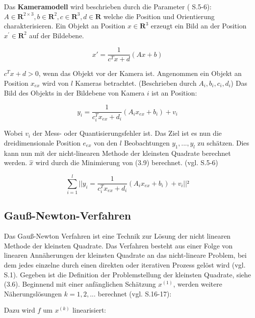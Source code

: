 Das \textbf{Kameramodell} wird beschrieben durch die Parameter (\cite{nonlinear_1} S.5-6): $A \in  \textbf{R}^{2\times 3}, b \in \textbf{R}^2, c \in  \textbf{R}^3, d \in \textbf{R}$ welche die Position und Orientierung charakterisieren. Ein Objekt an Position $x \in \textbf{R}^3 $ erzeugt ein Bild an der Position $x^\prime \in \textbf{R}^2$ auf der Bildebene.

\begin{equation}
x \prime = \frac{1}{c^Tx+d} (Ax +b )
\end{equation}

$c^Tx+d >0$, wenn das Objekt vor der Kamera ist. Angenommen ein Objekt an Position $x_{ex}$ wird von $l$ Kameras betrachtet. (Beschrieben durch $A_i,b_i,c_i,d_i$) Das Bild des Objekts in der Bildebene von Kamera $i$ ist an Position:

\begin{equation}
y_i = \frac{1}{c_i^T x_{ex}+d_i}(A_i x_{ex} + b_i) + v_i
\end{equation}

Wobei $v_i$ der Mess- oder Quantisierungsfehler ist. Das Ziel ist es nun die dreidimensionale Position $e_{ex}$ von den $l$ Beobachtungen $y_1,...,y_l$ zu schätzen. Dies kann nun mit der nicht-linearen Methode der kleinsten Quadrate berechnet werden. $\hat x$ wird durch die Minimierung von (3.9) berechnet. (vgl. \cite{nonlinear_1} S.5-6)

\begin{equation}
\sum_{i=1}^l || y_i = \frac{1}{c_i^T x_{ex}+d_i}(A_i x_{ex} + b_i) + v_i||²
\end{equation}

\subsection{Gauß-Newton-Verfahren}

Das Gauß-Newton Verfahren ist eine Technik zur Lösung der nicht linearen Methode der kleinsten Quadrate. Das Verfahren besteht aus einer Folge von linearen Annäherungen der kleinsten Quadrate an das nicht-lineare Problem, bei dem jedes einzelne durch einen direkten oder iterativen Prozess gelöst wird (vgl. \cite{approx_gn} S.1). Gegeben ist die Definition der Problemstellung der kleinsten Quadrate, siehe (3.6). Beginnend mit einer anfänglichen Schätzung $x^{(1)}$, werden weitere Näherungslösungen $k = 1,2,...$ berechnet (vgl. \cite{nonlinear_1} S.16-17):

Dazu wird $f$ um $x^{(k)}$ linearisiert:

